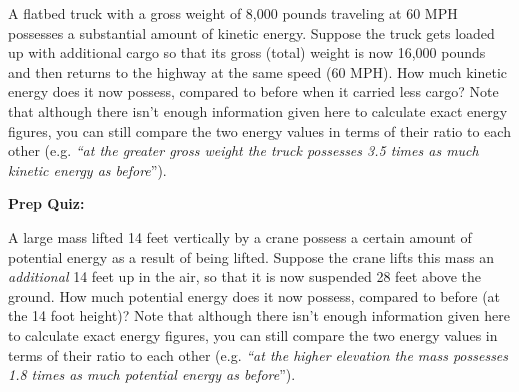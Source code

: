 A flatbed truck with a gross weight of 8,000 pounds traveling at 60 MPH possesses a substantial amount of kinetic energy.  Suppose the truck gets loaded up with additional cargo so that its gross (total) weight is now 16,000 pounds and then returns to the highway at the same speed (60 MPH).  How much kinetic energy does it now possess, compared to before when it carried less cargo?  Note that although there isn't enough information given here to calculate exact energy figures, you can still compare the two energy values in terms of their ratio to each other (e.g. {\it ``at the greater gross weight the truck possesses 3.5 times as much kinetic energy as before}'').











\vfil \eject

\noindent
{\bf Prep Quiz:}

A large mass lifted 14 feet vertically by a crane possess a certain amount of potential energy as a result of being lifted.  Suppose the crane lifts this mass an {\it additional} 14 feet up in the air, so that it is now suspended 28 feet above the ground.  How much potential energy does it now possess, compared to before (at the 14 foot height)?  Note that although there isn't enough information given here to calculate exact energy figures, you can still compare the two energy values in terms of their ratio to each other (e.g. {\it ``at the higher elevation the mass possesses 1.8 times as much potential energy as before}'').




